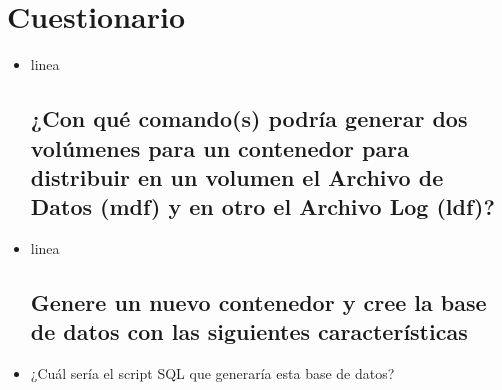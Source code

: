 \section{Cuestionario} 
\begin{itemize}
\subsection{¿Con qué comando(s) exportaría la imagen de Docker de Microsoft SQL Server a otra PC o servidor?}
	\item linea
\subsection{¿Con qué comando(s) podría generar dos volúmenes para un contenedor para distribuir en un volumen el Archivo
de Datos (mdf) y en otro el Archivo Log (ldf)?}
	\item linea


\subsection{Genere un nuevo contenedor y cree la base de datos con las siguientes características}
\item ¿Cuál sería el script SQL que generaría esta base de datos?

\end{itemize}